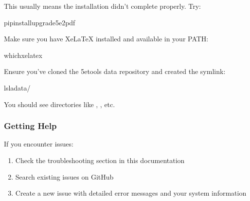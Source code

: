 \documentclass[letterpaper,10pt,english]{sphinxmanual}
\begin{document}
\sphinxAtStartPar
This usually means the installation didn’t complete properly. Try:

\begin{sphinxVerbatim}[commandchars=\\\{\}]
pipinstall\PYGZhy{}\PYGZhy{}upgrade5e2pdf
\end{sphinxVerbatim}

\sphinxAtStartPar
{}

\sphinxAtStartPar
Make sure you have XeLaTeX installed and available in your PATH:

\begin{sphinxVerbatim}[commandchars=\\\{\}]
whichxelatex
\end{sphinxVerbatim}

\sphinxAtStartPar
{}

\sphinxAtStartPar
Ensure you’ve cloned the 5etools data repository and created the symlink:

\begin{sphinxVerbatim}[commandchars=\\\{\}]
ls\PYGZhy{}ladata/
\end{sphinxVerbatim}

\sphinxAtStartPar
You should see directories like , , etc.


\subsubsection{Getting Help}
\label{\detokenize{user-guide/installation:getting-help}}
\sphinxAtStartPar
If you encounter issues:
\begin{enumerate}
%
\item {} 
\sphinxAtStartPar
Check the troubleshooting section in this documentation

\item {} 
\sphinxAtStartPar
Search existing issues on GitHub

\item {} 
\sphinxAtStartPar
Create a new issue with detailed error messages and your system information

\end{enumerate}

\sphinxstepscope
\end{document}
